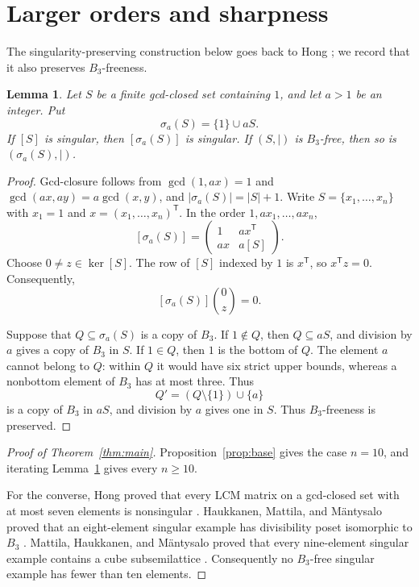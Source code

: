 \documentclass[11pt]{amsart}
\newtheorem{lemma}[theorem]{Lemma}
\begin{document}
\section{Larger orders and sharpness}

The singularity-preserving construction below goes back to Hong
\cite{Hong1999}; we record that it also preserves $B_3$-freeness.

\begin{lemma}\label{lem:stabilization}
Let $S$ be a finite gcd-closed set containing $1$, and let $a>1$ be an
integer. Put
\[
 \sigma_a(S)=\{1\}\cup aS.
\]
If $[S]$ is singular, then $[\sigma_a(S)]$ is singular. If
$(S,\mid)$ is $B_3$-free, then so is $(\sigma_a(S),\mid)$.
\end{lemma}

\begin{proof}
Gcd-closure follows from $\gcd(1,ax)=1$ and
$\gcd(ax,ay)=a\gcd(x,y)$, and
$|\sigma_a(S)|=|S|+1$.
Write $S=\{x_1,\dots,x_n\}$ with $x_1=1$ and
$x=(x_1,\dots,x_n)^{\mathsf T}$. In the order
$1,ax_1,\dots,ax_n$,
\[
 [\sigma_a(S)]
 =
 \begin{pmatrix}
  1  & ax^{\mathsf T}\\
  ax & a[S]
 \end{pmatrix}.
\]
Choose $0\ne z\in\ker[S]$. The row of $[S]$ indexed by $1$ is
$x^{\mathsf T}$, so $x^{\mathsf T}z=0$. Consequently,
\[
 [\sigma_a(S)]\binom{0}{z}=0.
\]

Suppose that $Q\subseteq\sigma_a(S)$ is a copy of $B_3$. If
$1\notin Q$, then $Q\subseteq aS$, and division by $a$ gives a copy of
$B_3$ in $S$. If $1\in Q$, then $1$ is the bottom of $Q$. The element
$a$ cannot belong to $Q$: within $Q$ it would have six strict upper
bounds, whereas a nonbottom element of $B_3$ has at most three.
Thus
\[
 Q'=(Q\setminus\{1\})\cup\{a\}
\]
is a copy of $B_3$ in $aS$, and division by $a$ gives one in $S$.
Thus $B_3$-freeness is preserved.
\end{proof}

\begin{proof}[Proof of Theorem~\ref{thm:main}]
Proposition~\ref{prop:base} gives the case $n=10$, and iterating
Lemma~\ref{lem:stabilization} gives every $n\ge 10$.

For the converse, Hong proved that every LCM matrix on a gcd-closed
set with at most seven elements is nonsingular \cite{Hong1999}.
Haukkanen, Mattila, and M\"antysalo proved that an eight-element
singular example has divisibility poset isomorphic to $B_3$
\cite{HaukkanenMattilaMantysalo2015}. Mattila, Haukkanen, and
M\"antysalo proved that every nine-element singular example contains
a cube subsemilattice \cite{MattilaHaukkanenMantysalo2024}.
Consequently no $B_3$-free singular example has fewer than ten
elements.
\end{proof}
\end{document}
